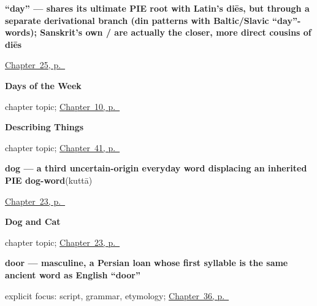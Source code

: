 \noindent\begin{minipage}[t]{\linewidth}
\raggedright
\textbf{\textquotedblleft{}day\textquotedblright{} — shares its ultimate PIE root with Latin's diēs, but through a separate derivational branch (din patterns with Baltic/Slavic \textquotedblleft{}day\textquotedblright{}-words); Sanskrit's own / are actually the closer, more direct cousins of diēs}\enspace\emph{}\par
\footnotesize \hyperref[ch:hi-day]{Chapter~25, p.~\pageref*{ch:hi-day}}
\end{minipage}\par\smallskip

\noindent\begin{minipage}[t]{\linewidth}
\raggedright
\textbf{Days of the Week}\par
\footnotesize chapter topic; \hyperref[ch:hi-days-of-the-week]{Chapter~10, p.~\pageref*{ch:hi-days-of-the-week}}
\end{minipage}\par\smallskip

\noindent\begin{minipage}[t]{\linewidth}
\raggedright
\textbf{Describing Things}\par
\footnotesize chapter topic; \hyperref[ch:hi-describing-things]{Chapter~41, p.~\pageref*{ch:hi-describing-things}}
\end{minipage}\par\smallskip

\noindent\begin{minipage}[t]{\linewidth}
\raggedright
\textbf{dog — a third uncertain-origin everyday word displacing an inherited PIE dog-word}\enspace\emph{}\enspace(kuttā)\par
\footnotesize \hyperref[ch:hi-dog-and-cat]{Chapter~23, p.~\pageref*{ch:hi-dog-and-cat}}
\end{minipage}\par\smallskip

\noindent\begin{minipage}[t]{\linewidth}
\raggedright
\textbf{Dog and Cat}\par
\footnotesize chapter topic; \hyperref[ch:hi-dog-and-cat]{Chapter~23, p.~\pageref*{ch:hi-dog-and-cat}}
\end{minipage}\par\smallskip

\noindent\begin{minipage}[t]{\linewidth}
\raggedright
\textbf{door — masculine, a Persian loan whose first syllable is the same ancient word as English \textquotedblleft{}door\textquotedblright{}}\enspace\emph{}\par
\footnotesize explicit focus: script, grammar, etymology; \hyperref[ch:hi-one-house-four-languages]{Chapter~36, p.~\pageref*{ch:hi-one-house-four-languages}}
\end{minipage}\par\smallskip

